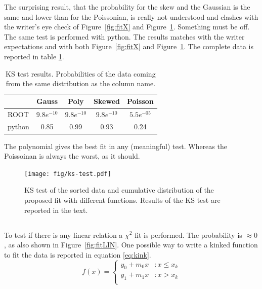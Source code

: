 \documentclass[twocolumn]{article}
\begin{document}
		The surprising result, that the probability for the skew and the Gaussian is the same and lower than for the Poissonian, is really not understood and clashes with the writer's eye check of Figure~\ref{fig:fitX} and Figure~\ref{fig:test}.
		Something must be off. 
		The same test is  performed  with python. The results matches with the writer expectations and with  both Figure~\ref{fig:fitX} and Figure~\ref{fig:test}.
		The complete data is reported in table \ref{tab:tests}.
		\begin{table}[tb]
			\caption{KS test results. Probabilities  of the data  coming from the same distribution as the column name.}
			\label{tab:tests}
			\begin{center}
				\begin{tabular}{l|cccc}
				\hline
		
				\hline
				\textbf{} & \textbf{Gauss} & \textbf{Poly} &  \textbf{Skewed} & \textbf{Poisson} \\
				\hline
				ROOT	& $9.8e^{-10 }$& $9.8e^{-10 }$  &  $9.8e^{-10 }$  & $5.5e^{-05}$ \\
				python	 & 0.85  & 0.99   & 0.93 & 0.24   \\
				\hline
		
				\hline
				\end{tabular}
			\end{center}
		\end{table}

			The polynomial gives  the best fit in any (meaningful) test. Whereas the Poissoinan is always the worst, as it should.

		\begin{figure}[h!]
			\begin{center}
				\texttt{[image: fig/ks-test.pdf]}
			\end{center}
			\caption{KS test of the sorted data and cumulative distribution of the proposed fit with different functions. Results  of the KS test are reported in the text.}
			\label{fig:test}
		\end{figure}

	\subsection{}
	\label{subs:randommea}
		To test if there is any linear relation a $\chi^2$ fit is performed. The probability is $\approx 0 $, as also shown in Figure~\ref{fig:fitLIN}.
		One possible way to write a kinked function to fit the data is reported in equation \ref{eq:kink}.
		\begin{equation}
		\label{eq:kink}
			  f(x) = \left\{
		     \begin{array}{lr}
		       y_0 + m_0 x  & : x \le x_k \\
		       y_1 + m_1 x  & : x > x_k \\
		     \end{array}
		   \right.
		\end{equation}
\end{document}
